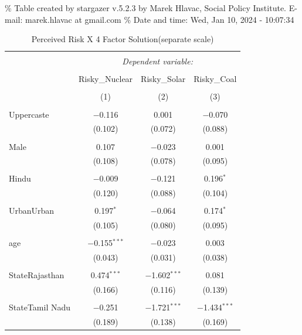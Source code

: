 \documentclass[
]{article}
\begin{document}
\begingroup\setlength{\tabcolsep}{1pt}

\renewcommand{\arraystretch}{0.7}

\% Table created by stargazer v.5.2.3 by Marek Hlavac, Social Policy
Institute. E-mail: marek.hlavac at gmail.com \% Date and time: Wed, Jan
10, 2024 - 10:07:34

\begin{table}[!htbp] \centering 
  \caption{Perceived Risk X 4 Factor Solution(separate scale)} 
  \label{} 
\begin{tabular}{@{\extracolsep{5pt}}lccc} 
\\[-1.8ex]\hline 
\hline \\[-1.8ex] 
 & \multicolumn{3}{c}{\textit{Dependent variable:}} \\ 
\cline{2-4} 
\\[-1.8ex] & Risky\_Nuclear & Risky\_Solar & Risky\_Coal \\ 
\\[-1.8ex] & (1) & (2) & (3)\\ 
\hline \\[-1.8ex] 
 Uppercaste & $-$0.116 & 0.001 & $-$0.070 \\ 
  & (0.102) & (0.072) & (0.088) \\ 
  & & & \\ 
 Male & 0.107 & $-$0.023 & 0.001 \\ 
  & (0.108) & (0.078) & (0.095) \\ 
  & & & \\ 
 Hindu & $-$0.009 & $-$0.121 & 0.196$^{*}$ \\ 
  & (0.120) & (0.088) & (0.104) \\ 
  & & & \\ 
 UrbanUrban & 0.197$^{*}$ & $-$0.064 & 0.174$^{*}$ \\ 
  & (0.105) & (0.080) & (0.095) \\ 
  & & & \\ 
 age & $-$0.155$^{***}$ & $-$0.023 & 0.003 \\ 
  & (0.043) & (0.031) & (0.038) \\ 
  & & & \\ 
 StateRajasthan & 0.474$^{***}$ & $-$1.602$^{***}$ & 0.081 \\ 
  & (0.166) & (0.116) & (0.139) \\ 
  & & & \\ 
 StateTamil Nadu & $-$0.251 & $-$1.721$^{***}$ & $-$1.434$^{***}$ \\ 
  & (0.189) & (0.138) & (0.169) \\ 

\end{tabular}
\end{table}
\end{document}
